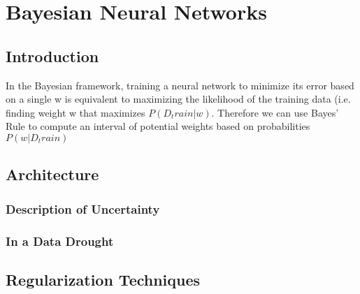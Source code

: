 \chapter{Bayesian Neural Networks}

\section{Introduction}
 In the Bayesian framework, training a neural network to minimize its error based on a single w is equivalent to maximizing the likelihood of the training data (i.e. finding weight w that maximizes $P(D_train|w)$. Therefore we can use Bayes’ Rule to compute an interval of potential weights based on probabilities $P(w|D_train)$

\section{Architecture}

\subsection{Description of Uncertainty}

\subsection{In a Data Drought}

\section{Regularization Techniques}